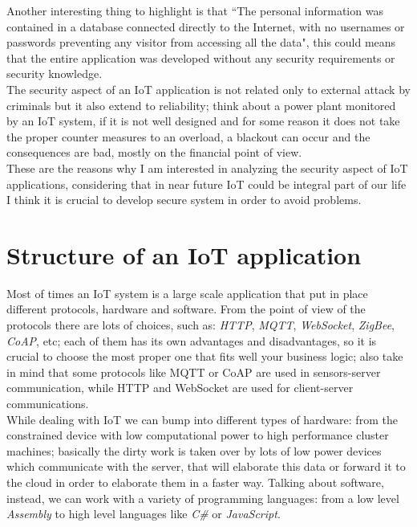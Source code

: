 \documentclass[12pt]{report}
\begin{document}
Another interesting thing to highlight is that ``The personal information was contained in a database connected directly to the Internet, with no usernames or passwords preventing any visitor from accessing all the data", this could means that the entire application was developed without any security requirements or security knowledge.\\
 
The security aspect of an IoT application is not related only to external attack by criminals but it also extend to reliability; think about a power plant monitored by
an IoT system, if it is not well designed and for some reason it does not take the proper counter measures to an overload, a blackout can occur and the consequences are bad, mostly on the financial point of view.\\
These are the reasons why I am interested in analyzing the security aspect of IoT applications, considering that in near future
IoT could be integral part of our life I think it is crucial to develop secure system in order to avoid problems.


\section{Structure of an IoT application}
\bigskip
Most of times an IoT system is a large scale application that put in place different protocols, hardware and software.\newline
From the point of view of the protocols there are lots of choices, such as: \emph{HTTP}, \emph{MQTT}, \emph{WebSocket}, \emph{ZigBee}, \emph{CoAP}, etc; each of them has its own advantages and disadvantages, so it is crucial to choose the most proper one that fits well your business logic; also take in mind that some protocols like MQTT or CoAP are used in sensors-server communication, while HTTP and WebSocket
are used for client-server communications.\\

While dealing with IoT we can bump into different types of hardware: from the constrained device with low computational power to high performance cluster machines; basically the dirty work is taken over by lots of low power devices which communicate with the server,
that will elaborate this data or forward it to the cloud in order to elaborate them in a faster way.\newline
Talking about software, instead, we can work with a variety of programming languages: from a low level \emph{Assembly} to high level languages like \emph{C\#} or \emph{JavaScript}.\\
\end{document}
